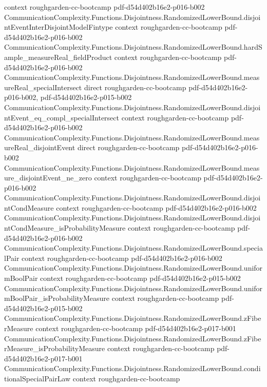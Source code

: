\begin{theorem}
  {context}
  {roughgarden-cc-bootcamp}
  {pdf-d54d402b16e2-p016-b002}
\proofstep
  {CommunicationComplexity.Functions.Disjointness.RandomizedLowerBound.disjointEventInterDisjointModelFintype}
  {context}
  {roughgarden-cc-bootcamp}
  {pdf-d54d402b16e2-p016-b002}
\proofstep
  {CommunicationComplexity.Functions.Disjointness.RandomizedLowerBound.hardSample_measureReal_fieldProduct}
  {context}
  {roughgarden-cc-bootcamp}
  {pdf-d54d402b16e2-p016-b002}
\proofstep
  {CommunicationComplexity.Functions.Disjointness.RandomizedLowerBound.measureReal_specialIntersect}
  {direct}
  {roughgarden-cc-bootcamp}
  {pdf-d54d402b16e2-p016-b002,
    pdf-d54d402b16e2-p015-b002}
\proofstep
  {CommunicationComplexity.Functions.Disjointness.RandomizedLowerBound.disjointEvent_eq_compl_specialIntersect}
  {context}
  {roughgarden-cc-bootcamp}
  {pdf-d54d402b16e2-p016-b002}
\proofstep
  {CommunicationComplexity.Functions.Disjointness.RandomizedLowerBound.measureReal_disjointEvent}
  {direct}
  {roughgarden-cc-bootcamp}
  {pdf-d54d402b16e2-p016-b002}
\proofstep
  {CommunicationComplexity.Functions.Disjointness.RandomizedLowerBound.measure_disjointEvent_ne_zero}
  {context}
  {roughgarden-cc-bootcamp}
  {pdf-d54d402b16e2-p016-b002}
\proofstep
  {CommunicationComplexity.Functions.Disjointness.RandomizedLowerBound.disjointCondMeasure}
  {context}
  {roughgarden-cc-bootcamp}
  {pdf-d54d402b16e2-p016-b002}
\proofstep
  {CommunicationComplexity.Functions.Disjointness.RandomizedLowerBound.disjointCondMeasure_isProbabilityMeasure}
  {context}
  {roughgarden-cc-bootcamp}
  {pdf-d54d402b16e2-p016-b002}
\proofstep
  {CommunicationComplexity.Functions.Disjointness.RandomizedLowerBound.specialPair}
  {context}
  {roughgarden-cc-bootcamp}
  {pdf-d54d402b16e2-p016-b002}
\proofstep
  {CommunicationComplexity.Functions.Disjointness.RandomizedLowerBound.uniformBoolPair}
  {context}
  {roughgarden-cc-bootcamp}
  {pdf-d54d402b16e2-p015-b002}
\proofstep
  {CommunicationComplexity.Functions.Disjointness.RandomizedLowerBound.uniformBoolPair_isProbabilityMeasure}
  {context}
  {roughgarden-cc-bootcamp}
  {pdf-d54d402b16e2-p015-b002}
\proofstep
  {CommunicationComplexity.Functions.Disjointness.RandomizedLowerBound.zFiberMeasure}
  {context}
  {roughgarden-cc-bootcamp}
  {pdf-d54d402b16e2-p017-b001}
\proofstep
  {CommunicationComplexity.Functions.Disjointness.RandomizedLowerBound.zFiberMeasure_isProbabilityMeasure}
  {context}
  {roughgarden-cc-bootcamp}
  {pdf-d54d402b16e2-p017-b001}
\proofstep
  {CommunicationComplexity.Functions.Disjointness.RandomizedLowerBound.conditionalSpecialPairLaw}
  {context}
  {roughgarden-cc-bootcamp}

\end{theorem}
